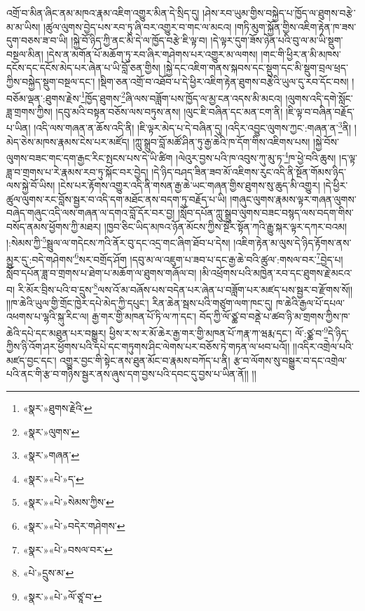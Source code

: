 འགྲོ་བ་མིན་ཞིང་ནམ་མཁའ་རྣམ་འཇིག་འགྱུར་མིན་དེ་སྲིད་དུ། །ཤེས་རབ་ཡུམ་གྱིས་བསྐྱེད་པ་ཁྱོད་ལ་ཐུགས་བརྩེ་མ་མ་ཡིས། །ཚུལ་ལུགས་བྱེད་པས་རབ་ཏུ་ཞི་བར་འགྱུར་བ་གང་ལ་མངའ། །གཏི་མུག་སྐྱོན་གྱིས་འཇིག་རྟེན་ཁ་ཟས་དུག་བཅས་ཟ་བ་ཡི། །སྐྱེ་བོ་ཉིད་ཀྱི་ནང་མི་དེ་ལ་ཁྱོད་བརྩེ་ཇི་ལྟ་བ། །དེ་ལྟར་དུག་ཟོས་ཉེན་པའི་བུ་ལ་མ་ཡི་སྡུག་བསྔལ་མིན། །དེས་ན་མགོན་པོ་མཆོག་ཏུ་རབ་ཞིར་གཤེགས་པར་འགྱུར་མ་ལགས། །གང་གི་ཕྱིར་ན་མི་མཁས་དངོས་དང་དངོས་མེད་པར་ཞེན་པ་ཡི་བློ་ཅན་གྱིས། །སྐྱེ་དང་འཇིག་གནས་སྐབས་དང་སྡུག་དང་མི་སྡུག་བྲལ་ཕྲད་ཀྱིས་བསྐྱེད་སྡུག་བསྔལ་དང་། །སྡིག་ཅན་འགྲོ་བ་འཐོབ་པ་དེ་ཕྱིར་འཇིག་རྟེན་ཐུགས་བརྩེའི་ཡུལ་དུ་རབ་དོང་བས། །བཅོམ་ལྡན་:ཐུགས་རྗེས་\footnote{«སྣར་»ཐུགས་རྗེའི་}ཁྱོད་ཐུགས་\footnote{«སྣར་»ལུགས་}ཞི་ལས་བཟློག་པས་ཁྱོད་ལ་མྱ་ངན་འདས་མི་མངའ། །ལུགས་འདི་དགེ་སློང་ཟླ་གྲགས་ཀྱིས། །དབུ་མའི་བསྟན་བཅོས་ལས་བཏུས་ནས། །ལུང་ཇི་བཞིན་དང་མན་ངག་ནི། །ཇི་ལྟ་བ་བཞིན་བརྗོད་པ་ཡིན། །འདི་ལས་གཞན་ན་ཆོས་འདི་ནི། །ཇི་ལྟར་མེད་པ་དེ་བཞིན་དུ། །འདིར་འབྱུང་ལུགས་ཀྱང་:གཞན་ན་\footnote{«སྣར་»གཞན་}ནི། །མེད་ཅེས་མཁས་རྣམས་ངེས་པར་མཛོད། །ཀླུ་སྒྲུབ་བློ་མཚོ་ཤིན་ཏུ་རྒྱ་ཆེའི་ཁ་དོག་གིས་འཇིགས་པས། །སྐྱེ་བོས་ལུགས་བཟང་གང་དག་རྒྱང་རིང་སྤངས་པས་དེ་ཡི་ཚིག །ལེའུར་བྱས་པའི་ཁ་འབུས་ཀུ་མུ་ཏ་\footnote{«སྣར་»«པེ་»ད་}ཁ་ཕྱེ་བའི་ཆུས། །ད་ལྟ་ཟླ་བ་གྲགས་པ་རེ་རྣམས་རབ་ཏུ་སྐོང་བར་བྱེད། །དེ་ཉིད་བཤད་ཟིན་ཟབ་མོ་འཇིགས་རུང་འདི་ནི་སྔོན་གོམས་ཉིད་ལས་སྐྱེ་བོ་ཡིས། །ངེས་པར་རྟོགས་འགྱུར་འདི་ནི་གསན་རྒྱ་ཆེ་ཡང་གཞན་གྱིས་ཐུགས་སུ་ཆུད་མི་འགྱུར། །དེ་ཕྱིར་ཚུལ་ལུགས་རང་བློས་སྦྱར་བ་འདི་དག་མཐོང་ནས་བདག་ཏུ་བརྗོད་པ་ཡི། །གཞུང་ལུགས་རྣམས་ལྟར་གཞན་ལུགས་བཞེད་གཞུང་འདི་ལས་གཞན་ལ་དགའ་བློ་དོར་བར་བྱ། །སློབ་དཔོན་ཀླུ་སྒྲུབ་ལུགས་བཟང་བསྙད་ལས་བདག་གིས་བསོད་ནམས་ཕྱོགས་ཀྱི་མཐར། །ཁྱབ་ཅིང་ཡིད་མཁའ་ཉོན་མོངས་ཀྱིས་སྔོར་སྟོན་ཀའི་རྒྱུ་སྐར་ལྟར་དཀར་བའམ། །:སེམས་ཀྱི་\footnote{«སྣར་»«པེ་»སེམས་ཀྱིས་}སྦྲུལ་ལ་གདེངས་ཀའི་ནོར་བུ་དང་འདྲ་གང་ཞིག་ཐོབ་པ་དེས། །འཇིག་རྟེན་མ་ལུས་དེ་ཉིད་རྟོགས་ནས་མྱུར་དུ་:བདེ་གཤེགས་\footnote{«སྣར་»«པེ་»བདེར་གཤེགས་}སར་བགྲོད་ཤོག །དབུ་མ་ལ་འཇུག་པ་ཟབ་པ་དང་རྒྱ་ཆེ་བའི་ཚུལ་:གསལ་བར་\footnote{«སྣར་»«པེ་»བསལ་བར་}བྱེད་པ། སློབ་དཔོན་ཟླ་བ་གྲགས་པ་ཐེག་པ་མཆོག་ལ་ཐུགས་གཞོལ་བ། །མི་འཕྲོགས་པའི་མཁྱེན་རབ་དང་ཐུགས་རྗེ་མངའ་བ། རི་མོར་བྲིས་པའི་བ་དྲུས་\footnote{«པེ་»དྲུས་མ་}ལས་འོ་མ་བཞོས་པས་བདེན་པར་ཞེན་པ་བཟློག་པར་མཛད་པས་སྦྱར་བ་རྫོགས་སོ།། །།ཁ་ཆེའི་ཡུལ་གྱི་གྲོང་ཁྱེར་དཔེ་མེད་ཀྱི་དཔུང་། རིན་ཆེན་སྦས་པའི་གཙུག་ལག་ཁང་དུ། ཁ་ཆེའི་རྒྱལ་པོ་དཔལ་འཕགས་པ་ལྷའི་སྐུ་རིང་ལ། རྒྱ་གར་གྱི་མཁན་པོ་ཏི་ལ་ཀ་དང་། བོད་ཀྱི་ལོ་ཙྪ་བ་བནྡེ་པ་ཚབ་ཉི་མ་གྲགས་ཀྱིས་ཁ་ཆེའི་དཔེ་དང་མཐུན་པར་བསྒྱུར། ཕྱིས་ར་ས་ར་མོ་ཆེར་རྒྱ་གར་གྱི་མཁན་པོ་ཀརྣ་ཀ་ཝརྨ་དང་། ལོ་:ཙྪ་བ་\footnote{«སྣར་»«པེ་»ལོ་ཙཱ་བ་}དེ་ཉིད་ཀྱིས་ཉི་འོག་ཤར་ཕྱོགས་པའི་དཔེ་དང་གཏུགས་ཤིང་ལེགས་པར་བཅོས་ཏེ་གཏན་ལ་ཕབ་པའོ།། །།འདིར་འགྲེལ་པའི་མཛད་བྱང་དང་། འགྱུར་བྱང་གི་སྟེང་ནས་ཐུན་མོང་བ་རྣམས་བཀོད་པ་ནི། རྩ་བ་ལོགས་སུ་བསྒྱུར་བ་དང་འགྲེལ་པའི་ནང་གི་རྩ་བ་གཉིས་སྦྱར་ནས་ཞུས་དག་བྱས་པའི་དབང་དུ་བྱས་པ་ཡིན་ནོ།། །།